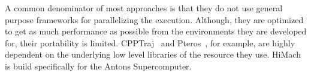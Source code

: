 



A common denominator of most approaches is that they do not use general purpose frameworks for parallelizing the execution.
Although, they are optimized to get as much performance as possible from the environments they are developed for, their portability is limited.
CPPTraj~\cite{roe2018parallelization} and Pteros~\cite{yesylevskyy2015pteros}, for example, are highly dependent on the underlying low level libraries of the resource they use.
HiMach~\cite{tiankai2008scalable} is build specifically for the Antons Supercomputer.

